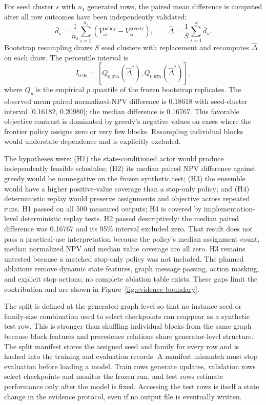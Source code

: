 \documentclass[11pt]{article}
\begin{document}
For seed cluster $s$ with $n_s$ generated rows, the paired mean difference is computed after all row outcomes have been independently validated:
\begin{equation}
\bar d_s=\frac{1}{n_s}\sum_{i=1}^{n_s}(V^{\mathrm{policy}}_{si}-V^{\mathrm{greedy}}_{si}),\qquad
\widehat\Delta=\frac{1}{S}\sum_{s=1}^{S}\bar d_s.
\label{eq:cluster-difference}
\end{equation}
Bootstrap resampling draws $S$ seed clusters with replacement and recomputes $\widehat\Delta$ on each draw. The percentile interval is
\begin{equation}
I_{0.95}=\left[Q_{0.025}(\widehat\Delta^*),Q_{0.975}(\widehat\Delta^*)\right],
\label{eq:bootstrap}
\end{equation}
where $Q_p$ is the empirical $p$ quantile of the frozen bootstrap replicates. The observed mean paired normalized-NPV difference is 0.18618 with seed-cluster interval [0.16182, 0.20980]; the median difference is 0.16767. This favorable objective contrast is dominated by greedy's negative values on cases where the frontier policy assigns zero or very few blocks. Resampling individual blocks would understate dependence and is explicitly excluded.

The hypotheses were: (H1) the state-conditioned actor would produce independently feasible schedules; (H2) its median paired NPV difference against greedy would be nonnegative on the frozen synthetic test; (H3) the ensemble would have a higher positive-value coverage than a stop-only policy; and (H4) deterministic replay would preserve assignments and objective across repeated runs. H1 passed on all 500 measured outputs; H4 is covered by implementation-level deterministic replay tests. H2 passed descriptively: the median paired difference was 0.16767 and its 95\% interval excluded zero. That result does not pass a practical-use interpretation because the policy's median assignment count, median normalized NPV and median value coverage are all zero. H3 remains untested because a matched stop-only policy was not included. The planned ablations remove dynamic state features, graph message passing, action masking, and explicit stop actions; no complete ablation table exists. These gaps limit the contribution and are shown in Figure~\ref{fig:evidence-boundary}.

The split is defined at the generated-graph level so that no instance seed or family-size combination used to select checkpoints can reappear as a synthetic test row. This is stronger than shuffling individual blocks from the same graph because block features and precedence relations share generator-level structure. The split manifest stores the assigned seed and family for every row and is hashed into the training and evaluation records. A manifest mismatch must stop evaluation before loading a model. Train rows generate updates, validation rows select checkpoints and monitor the frozen run, and test rows estimate performance only after the model is fixed. Accessing the test rows is itself a state change in the evidence protocol, even if no output file is eventually written.
\end{document}
